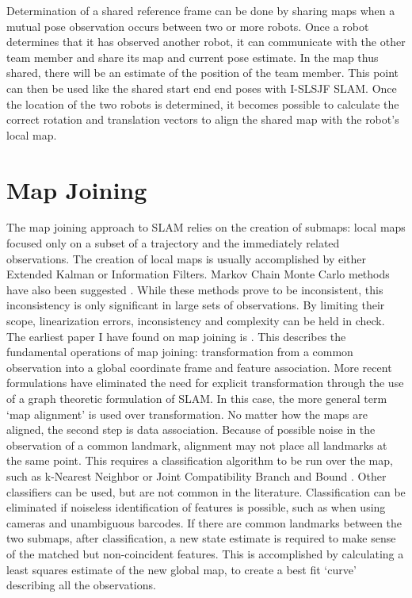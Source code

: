 \documentclass[12pt]{report}
\begin{document}
Determination of a shared reference frame can be done by sharing maps
when a mutual pose observation occurs between two or more robots. Once
a robot determines that it has observed another robot, it can
communicate with the other team member and share its map and current
pose estimate. In the map thus shared, there will be an estimate of
the position of the team member. This point can then be used like the
shared start end end poses with I-SLSJF SLAM. Once the location of the
two robots is determined, it becomes possible to calculate the correct
rotation and translation vectors to align the shared map with the
robot's local map.


\section{Map Joining}
The map joining approach to SLAM relies on the creation of submaps:
local maps focused only on a subset of a trajectory and the
immediately related observations. The creation of local maps is
usually accomplished by either Extended Kalman or Information Filters.
Markov Chain Monte Carlo methods have also been suggested . While
these methods prove to be inconsistent, this inconsistency is only
significant in large sets of observations. By limiting their scope,
linearization errors, inconsistency and complexity can be held in
check. The earliest paper I have found on map joining is
\cite{tardos2002}. This describes the fundamental operations of map
joining: transformation from a common observation into a global
coordinate frame and feature association. More recent formulations
\cite{c-sam} have eliminated the need for explicit transformation
through the use of a graph theoretic formulation of SLAM. In this
case, the more general term ‘map alignment’ is used over
transformation. No matter how the maps are aligned, the second step is
data association. Because of possible noise in the observation of a
common landmark, alignment may not place all landmarks at the same
point. This requires a classification algorithm to be run over the
map, such as k-Nearest Neighbor or Joint Compatibility Branch and
Bound \cite{tardos2002}. Other classifiers can be used, but are not
common in the literature. Classification can be eliminated if
noiseless identification of features is possible, such as when using
cameras and unambiguous barcodes. If there are common landmarks
between the two submaps, after classification, a new state estimate is
required to make sense of the matched but non-coincident features.
This is accomplished by calculating a least squares estimate of the
new global map, to create a best fit ‘curve’ describing all the
observations.
\end{document}
